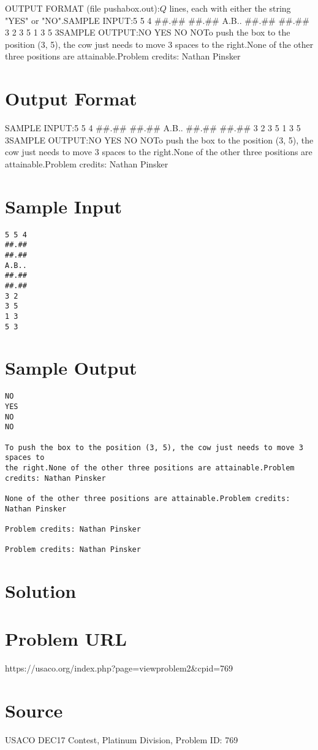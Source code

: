 \documentclass[12pt]{article}
\begin{document}
OUTPUT FORMAT (file pushabox.out):$Q$ lines, each with either the string "YES" or "NO".SAMPLE INPUT:5 5 4
##.##
##.##
A.B..
##.##
##.##
3 2
3 5
1 3
5 3SAMPLE OUTPUT:NO
YES
NO
NOTo push the box to the position (3, 5), the cow just needs to move 3 spaces to
the right.None of the other three positions are attainable.Problem credits: Nathan Pinsker

\section*{Output Format}
SAMPLE INPUT:5 5 4
##.##
##.##
A.B..
##.##
##.##
3 2
3 5
1 3
5 3SAMPLE OUTPUT:NO
YES
NO
NOTo push the box to the position (3, 5), the cow just needs to move 3 spaces to
the right.None of the other three positions are attainable.Problem credits: Nathan Pinsker

\section*{Sample Input}
\begin{verbatim}
5 5 4
##.##
##.##
A.B..
##.##
##.##
3 2
3 5
1 3
5 3
\end{verbatim}

\section*{Sample Output}
\begin{verbatim}
NO
YES
NO
NO

To push the box to the position (3, 5), the cow just needs to move 3 spaces to
the right.None of the other three positions are attainable.Problem credits: Nathan Pinsker

None of the other three positions are attainable.Problem credits: Nathan Pinsker

Problem credits: Nathan Pinsker

Problem credits: Nathan Pinsker
\end{verbatim}

\section*{Solution}


\section*{Problem URL}
https://usaco.org/index.php?page=viewproblem2&cpid=769

\section*{Source}
USACO DEC17 Contest, Platinum Division, Problem ID: 769
\end{document}
